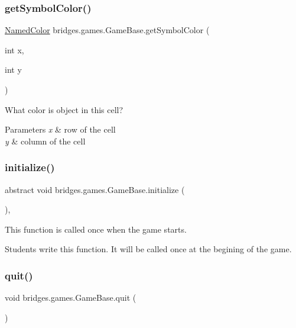 \subsubsection{\texorpdfstring{getSymbolColor()}{getSymbolColor()}}
{\footnotesize\ttfamily \mbox{\hyperlink{enumbridges_1_1base_1_1_named_color}{Named\+Color}} bridges.\+games.\+Game\+Base.\+get\+Symbol\+Color (\begin{DoxyParamCaption}\item[{int}]{x,  }\item[{int}]{y }\end{DoxyParamCaption})\hspace{0.3cm}{\ttfamily [protected]}}



What color is object in this cell? 


\begin{DoxyParams}{Parameters}
{\em x} & row of the cell \\
\hline
{\em y} & column of the cell \\
\hline
\end{DoxyParams}
\mbox{\label{classbridges_1_1games_1_1_game_base_a973a52d5eee7c29b01d668fba3c61657}} 
\subsubsection{\texorpdfstring{initialize()}{initialize()}}
{\footnotesize\ttfamily abstract void bridges.\+games.\+Game\+Base.\+initialize (\begin{DoxyParamCaption}{ }\end{DoxyParamCaption})\hspace{0.3cm}{\ttfamily [abstract]}, {\ttfamily [protected]}}



This function is called once when the game starts. 

Students write this function. It will be called once at the begining of the game. \mbox{\label{classbridges_1_1games_1_1_game_base_aa16a69dc83ee4e32150188e8acf1f897}} 
\subsubsection{\texorpdfstring{quit()}{quit()}}
{\footnotesize\ttfamily void bridges.\+games.\+Game\+Base.\+quit (\begin{DoxyParamCaption}{ }\end{DoxyParamCaption})\hspace{0.3cm}{\ttfamily [protected]}}



